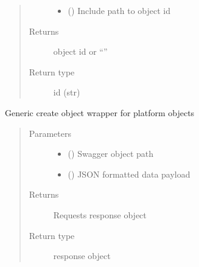 \documentclass[letterpaper,10pt,english]{sphinxmanual}
\begin{document}
\begin{fulllineitems}
\begin{fulllineitems}
\begin{quote}
\begin{description}
\begin{itemize}
\item {} 
\sphinxAtStartPar
{} () \textendash{} Include path to object id

\end{itemize}

\item[{Returns}] \leavevmode
\sphinxAtStartPar
object id or “”

\item[{Return type}] \leavevmode
\sphinxAtStartPar
id (str)

\end{description}\end{quote}

\end{fulllineitems}


\begin{fulllineitems}
\label{\detokenize{b1authn-class:bloxone.b1authn.update}}
\sphinxAtStartPar
Generic create object wrapper for platform objects
\begin{quote}\begin{description}
\item[{Parameters}] \leavevmode\begin{itemize}
\item {} 
\sphinxAtStartPar
{} () \textendash{} Swagger object path

\item {} 
\sphinxAtStartPar
{} () \textendash{} JSON formatted data payload

\end{itemize}

\item[{Returns}] \leavevmode
\sphinxAtStartPar
Requests response object

\item[{Return type}] \leavevmode
\sphinxAtStartPar
response object

\end{description}\end{quote}

\end{fulllineitems}


\end{fulllineitems}
\end{document}
